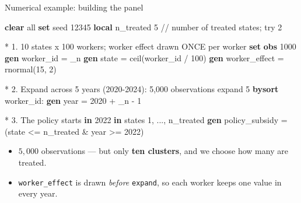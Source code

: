 \documentclass[
  11pt,
  ignorenonframetext,
  aspectratio=169,
]{beamer}
\newenvironment{Shaded}{\begin{snugshade}}{\end{snugshade}}
\newcommand{\CommentTok}[1]{\textcolor[rgb]{0.37,0.37,0.37}{#1}}
\newcommand{\DataTypeTok}[1]{\textcolor[rgb]{0.68,0.00,0.00}{#1}}
\newcommand{\DecValTok}[1]{\textcolor[rgb]{0.68,0.00,0.00}{#1}}
\newcommand{\FunctionTok}[1]{\textcolor[rgb]{0.28,0.35,0.67}{#1}}
\newcommand{\KeywordTok}[1]{\textcolor[rgb]{0.00,0.23,0.31}{\textbf{#1}}}
\newcommand{\NormalTok}[1]{\textcolor[rgb]{0.00,0.23,0.31}{#1}}
\newcommand{\OtherTok}[1]{\textcolor[rgb]{0.00,0.23,0.31}{#1}}
\providecommand{\tightlist}{%
  \setlength{\itemsep}{0pt}\setlength{\parskip}{0pt}}
\begin{document}
\begin{frame}[fragile]{Numerical example: building the panel}
\protect{}\label{numerical-example-building-the-panel}
\begin{Shaded}
\begin{Highlighting}[]
\KeywordTok{clear} \OtherTok{all}
\KeywordTok{set} \DecValTok{seed}\NormalTok{ 12345}
\KeywordTok{local}\NormalTok{ n\_treated 5                      }\CommentTok{// number of treated states; try 2}

\NormalTok{* 1. 10 states x 100 workers; worker effect drawn ONCE per worker}
\KeywordTok{set} \KeywordTok{obs}\NormalTok{ 1000}
\KeywordTok{gen}\NormalTok{ worker\_id = }\DataTypeTok{\_n}
\KeywordTok{gen}\NormalTok{ state = }\FunctionTok{ceil}\NormalTok{(worker\_id / 100)}
\KeywordTok{gen}\NormalTok{ worker\_effect = rnormal(15, 2)}

\NormalTok{* 2. Expand across 5 years (2020{-}2024): 5,000 observations}
\NormalTok{expand 5}
\KeywordTok{bysort}\NormalTok{ worker\_id: }\KeywordTok{gen} \FunctionTok{year}\NormalTok{ = 2020 + }\DataTypeTok{\_n}\NormalTok{ {-} 1}

\NormalTok{* 3. The policy starts }\KeywordTok{in}\NormalTok{ 2022 }\KeywordTok{in}\NormalTok{ states 1, ..., n\_treated}
\KeywordTok{gen}\NormalTok{ policy\_subsidy = (state \textless{}= }\OtherTok{\textasciigrave{}n\_treated\textquotesingle{}}\NormalTok{ \& }\FunctionTok{year}\NormalTok{ \textgreater{}= 2022)}
\end{Highlighting}
\end{Shaded}

\begin{itemize}
\tightlist
\item
  \(5{,}000\) observations --- but only \textbf{ten clusters}, and we
  choose how many are treated.
\item
  \texttt{worker\_effect} is drawn \emph{before} \texttt{expand}, so
  each worker keeps one value in every year.
\end{itemize}
\end{frame}
\end{document}
